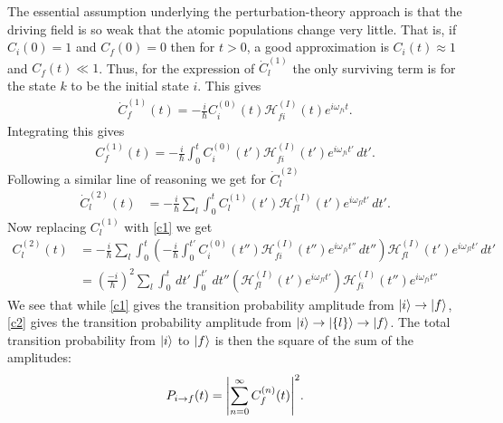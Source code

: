 \documentclass{book}
\theoremstyle{definition}
\newcommand{\ham}{\mathcal{H}}
\newcommand{\f}[2]{\frac{#1}{#2}}
\newcommand{\lp}{\left(}
\newcommand{\rp}{\right)}
\begin{document}
The essential assumption underlying the perturbation-theory approach is that the driving field is so weak that the atomic populations change very little. That is, if $C_i(0) = 1$ and $C_f(0) = 0$ then for $t > 0$, a good approximation is $C_i(t) \approx 1$ and $C_f(t) \ll 1$. Thus, for the expression of $\dot{C}^{(1)}_l$ the only surviving term is for the state $k$ to be the initial state $i$. This gives
\begin{align}
\dot{C}_f^{(1)}(t) = -\f{i}{\hbar} C_i^{(0)}(t)\ham^{(I)}_{fi}(t)e^{i\omega_{fi}t}.
\end{align}   
Integrating this gives
\begin{align}\label{c1}
{C}_f^{(1)}(t) = -\f{i}{\hbar}\int_0^t C_i^{(0)}(t')\ham^{(I)}_{fi}(t')e^{i\omega_{fi}t'}\,dt'.
\end{align}
Following a similar line of reasoning we get for $\dot{C}_l^{(2)}$
\begin{align}
\dot{C}_l^{(2)}(t) &= -\f{i}{\hbar}\sum_l \int_0^t C_l^{(1)}(t')\ham^{(I)}_{fl}(t')e^{i\omega_{fl}t'}\,dt'.
\end{align}
Now replacing $C_l^{(1)}$ with \eqref{c1} we get
\begin{align}\label{c2}
{C}_l^{(2)}(t) &= -\f{i}{\hbar}\sum_l \int_0^t 
\lp -\f{i}{\hbar}\int_0^{t'} C_i^{(0)}(t'')\ham^{(I)}_{fi}(t'')e^{i\omega_{fi}t''}\,dt''  \rp
\ham^{(I)}_{fl}(t')e^{i\omega_{fl}t'}\,dt'\\
&= \lp \f{-i}{\hbar} \rp^2 \sum_l \int_0^t\,dt' \int_0^{t'}\,dt'' \lp \ham^{(I)}_{fl}(t')e^{i\omega_{fl}t'}\rp \ham^{(I)}_{fi}(t'')e^{i\omega_{fi}t''} 
\end{align}
We see that while \eqref{c1} gives the transition probability amplitude from $\ket{i}\to \ket{f}$, \eqref{c2} gives the transition probability amplitude from $\ket{i} \to \ket{\{ l \}} \to \ket{f}$. The total transition probability from $\ket{i}$ to $\ket{f}$ is then the square of the sum of the amplitudes:
\begin{align}
P_{i\to f}(t)  = \abs{ \sum_{n=0}^\infty C^{(n)}_f(t)}^2.
\end{align}
\end{document}
